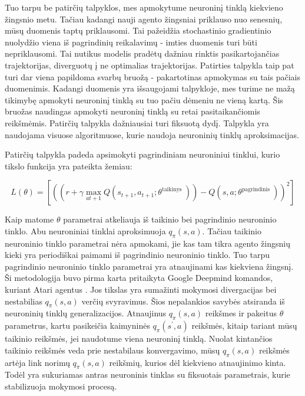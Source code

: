 \documentclass[a4paper, 12pt]{article}
\begin{document}
Tuo tarpu be patirčių talpyklos, mes apmokytume neuroninį tinklą kiekvieno žingsnio metu. Tačiau kadangi nauji agento žingsniai priklauso nuo senesnių, mūsų duomenis taptų priklausomi. Tai pažeidžia stochastinio gradientinio nuolydžio viena iš pagrindinių reikalavimų - imties duomenis turi būti nepriklausomi. Tai nutikus modelis pradėtų dažniau rinktis pasikartojančias trajektorijas, diverguotų į ne optimalias trajektorijas. Patirties talpykla taip pat turi dar viena papildoma svarbų bruožą - pakartotinas apmokymas su tais pačiais duomenimis. Kadangi duomenis yra išsaugojami talpykloje, mes turime ne mažą tikimybę apmokyti neuroninį tinklą su tuo pačiu dėmeniu ne vieną kartą. Šis bruožas naudingas apmokyti neuroninį tinklą su retai pasitaikančiomis reikšmėmis. Patirčių talpykla dažniausiai turi fiksuotą dydį. Talpykla yra naudojama visuose algoritmuose, kurie naudoja neuroninių tinklų aproksimacijas. 

Patirčių talpykla padeda apsimokyti pagrindiniam neuroniniui tinklui, kurio tikslo funkcija yra pateikta žemiau:

\begin{equation}
L(\theta)=\left[\left(\left(r+\gamma \max _{a t+1} Q\left(s_{t+1}, a_{t+1} ; \theta^{\text {taikinys }}\right)\right)-Q\left(s, a ; \theta^{\text {pagrindinis }}\right)\right)^{2}\right]
\end{equation}

Kaip matome $\theta$ parametrai atkeliauja iš taikinio bei pagrindinio neuroninio tinklo. Abu neuroniniai tinklai aproksimuoja $q_{\pi}(s, a)$. Tačiau taikinio neuroninio tinklo parametrai nėra apmokami, jie kas tam tikra agento žingsnių kieki yra periodiškai paimami iš pagrindinio neuroninio tinklo. Tuo tarpu pagrindinio neuroninio tinklo parametrai yra atnaujinami kas kiekviena žingsnį. Ši metodologija buvo pirma karta pritaikyta Google Deepmind komandos, kuriant Atari agentus \cite{GoogleDeepQLearning}. Jos tikslas yra sumažinti mokymosi divergacijas bei nestabilias $q_{\pi}(s, a)$ verčių svyravimus. Šios nepalankios savybės atsiranda iš neuroninių tinklų generalizacijos. Atnaujinus $q_{\pi}(s, a)$ reikšmes ir pakeitus $\theta$ parametrus, kartu pasikeičia kaimyninės $q_{\pi}(s^\prime, a)$ reikšmės, kitaip tariant mūsų taikinio reikšmės, jei naudotume viena neuroninį tinklą. Nuolat kintančios taikinio reikšmės veda prie nestabilaus konvergavimo, mūsų $q_{\pi}(s, a)$ reikšmės artėja link norimų $q_{\pi}(s, a)$ reikšmių, kurios dėl kiekvieno atnaujinimo kinta. Todėl yra sukuriamas antras neuroninis tinklas su fiksuotais parametrais, kurie stabilizuoja mokymosi procesą.
\end{document}
